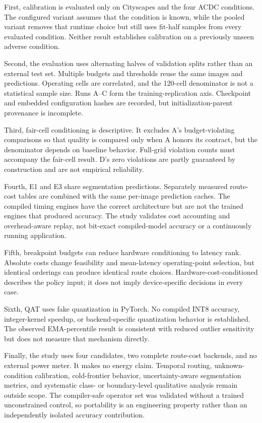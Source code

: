 \documentclass[a4paper,review,12pt]{elsarticle}
\begin{document}
First, calibration is evaluated only on Cityscapes and the four ACDC conditions. The configured variant assumes that the condition is known, while the pooled variant removes that runtime choice but still uses fit-half samples from every evaluated condition. Neither result establishes calibration on a previously unseen adverse condition.

Second, the evaluation uses alternating halves of validation splits rather than an external test set. Multiple budgets and thresholds reuse the same images and predictions. Operating cells are correlated, and the 120-cell denominator is not a statistical sample size. Runs A--C form the training-replication axis. Checkpoint and embedded configuration hashes are recorded, but initialization-parent provenance is incomplete.

Third, fair-cell conditioning is descriptive. It excludes A's budget-violating comparisons so that quality is compared only when A honors its contract, but the denominator depends on baseline behavior. Full-grid violation counts must accompany the fair-cell result. D's zero violations are partly guaranteed by construction and are not empirical reliability.

Fourth, E1 and E3 share segmentation predictions. Separately measured route-cost tables are combined with the same per-image prediction caches. The compiled timing engines have the correct architecture but are not the trained engines that produced accuracy. The study validates cost accounting and overhead-aware replay, not bit-exact compiled-model accuracy or a continuously running application.

Fifth, breakpoint budgets can reduce hardware conditioning to latency rank. Absolute costs change feasibility and mean-latency operating-point selection, but identical orderings can produce identical route choices. Hardware-cost-conditioned describes the policy input; it does not imply device-specific decisions in every case.

Sixth, QAT uses fake quantization in PyTorch. No compiled INT8 accuracy, integer-kernel speedup, or backend-specific quantization behavior is established. The observed EMA-percentile result is consistent with reduced outlier sensitivity but does not measure that mechanism directly.

Finally, the study uses four candidates, two complete route-cost backends, and no external power meter. It makes no energy claim. Temporal routing, unknown-condition calibration, cold-frontier behavior, uncertainty-aware segmentation metrics, and systematic class- or boundary-level qualitative analysis remain outside scope. The compiler-safe operator set was validated without a trained unconstrained control, so portability is an engineering property rather than an independently isolated accuracy contribution.
\end{document}
